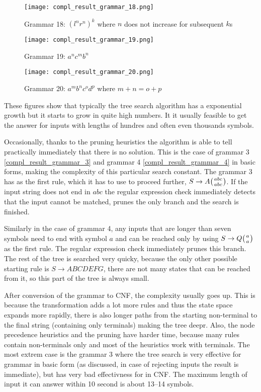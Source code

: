 \begin{figure}[h]
  \texttt{[image: compl\_result\_grammar\_18.png]}
  \caption{Grammar 18: $(l^nr^n)^k$ where $n$ does not increase for subsequent $k$s}
  \label{compl_result_grammar_18}
\end{figure}

\begin{figure}[h]
  \texttt{[image: compl\_result\_grammar\_19.png]}
  \caption{Grammar 19: $a^n c^m b^n$}
  \label{compl_result_grammar_19}
\end{figure}

\begin{figure}[h]
  \texttt{[image: compl\_result\_grammar\_20.png]}
  \caption{Grammar 20: $a^m b^n c^o d^p$ where $m+n = o+p$}
  \label{compl_result_grammar_20}
\end{figure}

These figures show that typically the tree search algorithm has a exponential growth but it starts to grow in quite high numbers. It it usually feasible to get the answer for inputs with lengths of hundres and often even thousands symbols.

Occasionally, thanks to the pruning heuristics the algorithm is able to tell practically immediately that there is no solution. This is the case of grammar 3 \ref{compl_result_grammar_3} and grammar 4 \ref{compl_result_grammar_4} in basic forms, making the complexity of this particular search constant. The grammar 3 has as the first rule, which it has to use to proceed further, $S \rightarrow A \wkpair{abc}{abc}$. If the input string does not end in $abc$ the regular expression check immediately detects that the input cannot be matched, prunes the only branch and the search is finished.

Similarly in the case of grammar 4, any inputs that are longer than seven symbols need to end with symbol $a$ and can be reached only by using $S \rightarrow Q \wkpair{a}{a}$ as the first rule. The regular expression check immediately prunes this branch. The rest of the tree is searched very quicky, because the only other possible starting rule is $S \rightarrow A B C D E F G$, there are not many states that can be reached from it, so this part of the tree is always small.

After conversion of the grammar to CNF, the complexity usually goes up. This is because the transformation adds a lot more rules and thus the state space expands more rapidly, there is also longer paths from the starting non-terminal to the final string (containing only terminals) making the tree deepr. Also, the node precedence heuristics and the pruning have harder time, because many rules contain non-terminals only and most of the heuristics work with terminals. The most extrem case is the grammar 3 where the tree search is very effective for grammar in basic form (as discussed, in case of rejecting inputs the result is immediate), but has very bad effectivness for in CNF. The maximum length of input it can answer within 10 second is about 13--14 symbols.

